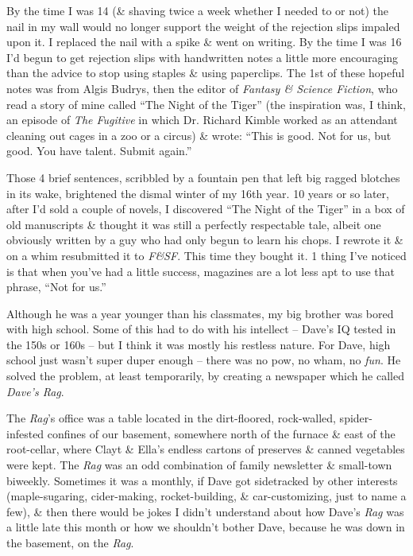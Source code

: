 \documentclass{article}
\numberwithin{equation}{section}
\begin{document}
By the time I was 14 (\& shaving twice a week whether I needed to or not) the nail in my wall would no longer support the weight of the rejection slips impaled upon it. I replaced the nail with a spike \& went on writing. By the time I was 16 I'd begun to get rejection slips with handwritten notes a little more encouraging than the advice to stop using staples \& using paperclips. The 1st of these hopeful notes was from Algis Budrys, then the editor of \textit{Fantasy \& Science Fiction}, who read a story of mine called ``The Night of the Tiger'' (the inspiration was, I think, an episode of \textit{The Fugitive} in which Dr. Richard Kimble worked as an attendant cleaning out cages in a zoo or a circus) \& wrote: ``This is good. Not for us, but good. You have talent. Submit again.''

Those 4 brief sentences, scribbled by a fountain pen that left big ragged blotches in its wake, brightened the dismal winter of my 16th year. 10 years or so later, after I'd sold a couple of novels, I discovered ``The Night of the Tiger'' in a box of old manuscripts \& thought it was still a perfectly respectable tale, albeit one obviously written by a guy who had only begun to learn his chops. I rewrote it \& on a whim resubmitted it to \textit{F\&SF}. This time they bought it. 1 thing I've noticed is that when you've had a little success, magazines are a lot less apt to use that phrase, ``Not for us.''

 Although he was a year younger than his classmates, my big brother was bored with high school. Some of this had to do with his intellect -- Dave's IQ tested in the 150s or 160s -- but I think it was mostly his restless nature. For Dave, high school just wasn't super duper enough -- there was no pow, no wham, no \textit{fun}. He solved the problem, at least temporarily, by creating a newspaper which he called \textit{Dave's Rag}.

The \textit{Rag}'s office was a table located in the dirt-floored, rock-walled, spider-infested confines of our basement, somewhere north of the furnace \& east of the root-cellar, where Clayt \& Ella's endless cartons of preserves \& canned vegetables were kept. The \textit{Rag} was an odd combination of family newsletter \& small-town biweekly. Sometimes it was a monthly, if Dave got sidetracked by other interests (maple-sugaring, cider-making, rocket-building, \& car-customizing, just to name a few), \& then there would be jokes I didn't understand about how Dave's \textit{Rag} was a little late this month or how we shouldn't bother Dave, because he was down in the basement, on the \textit{Rag}.
\end{document}
